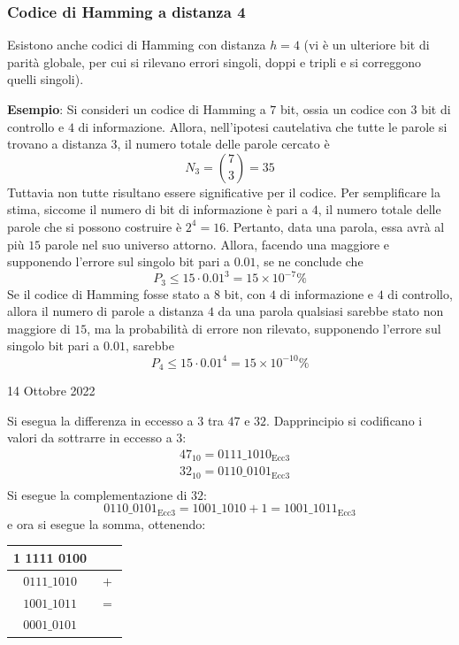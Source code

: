 \documentclass[a4paper]{extarticle}
\renewcommand\arraystretch{}
\begin{document}
\vspace{1em}
\subsubsection{Codice di Hamming a distanza 4}
Esistono anche codici di Hamming con distanza $h=4$ (vi è un ulteriore bit di parità globale, per cui si rilevano errori singoli, doppi e tripli e si correggono quelli singoli).

\vspace{2em}
\noindent
\textbf{Esempio}: Si consideri un codice di Hamming a $7$ bit, ossia un codice con $3$ bit di controllo e $4$ di informazione. Allora, nell'ipotesi cautelativa che tutte le parole si trovano a distanza $3$, il numero totale delle parole cercato è
\[N_3 = \binom{7}{3} = 35\]
Tuttavia non tutte risultano essere significative per il codice. Per semplificare la stima, siccome il numero di bit di informazione è pari a $4$, il numero totale delle parole che si possono costruire è $2^4=16$. Pertanto, data una parola, essa avrà al più $15$ parole nel suo universo attorno. Allora, facendo una maggiore e supponendo l'errore sul singolo bit pari a $0.01$, se ne conclude che
\[P_3 \leq 15 \cdot 0.01^3 = 15 \times 10^{-7}\%\]
Se il codice di Hamming fosse stato a $8$ bit, con $4$ di informazione e $4$ di controllo, allora il numero di parole a distanza $4$ da una parola qualsiasi sarebbe stato non maggiore di $15$, ma la probabilità di errore non rilevato, supponendo l'errore sul singolo bit pari a $0.01$, sarebbe
\[P_4 \leq 15 \cdot 0.01^4 = 15 \times 10^{-10}\%\]

\newpage
\begin{center}
    14 Ottobre 2022
\end{center}
Si esegua la differenza in eccesso a $3$ tra $47$ e $32$. Dapprincipio si codificano i valori da sottrarre in eccesso a $3$: 
\begin{align*}
    &47_{10} = 0111\_1010_\text{Ecc3}\\
    &32_{10} = 0110\_0101_\text{Ecc3}\\
\end{align*}
Si esegue la complementazione di $32$:
\[0110\_0101_\text{Ecc3} = 1001\_1010 + 1 = 1001\_1011_\text{Ecc3}\]
e ora si esegue la somma, ottenendo:
\noindent
\begin{table}[H]
\setlength{\tabcolsep}{4pt}
\renewcommand{\arraystretch}{1.2}
\centering
\begin{tabular}{cc}
    1 1111 0100  & \\
    \hline
    $0111\_1010$ & $+$\\
    \hline
    $1001\_1011$ & $=$\\
    \hline
    $0001\_0101$ & \\
\end{tabular}
\end{table}
\end{document}

